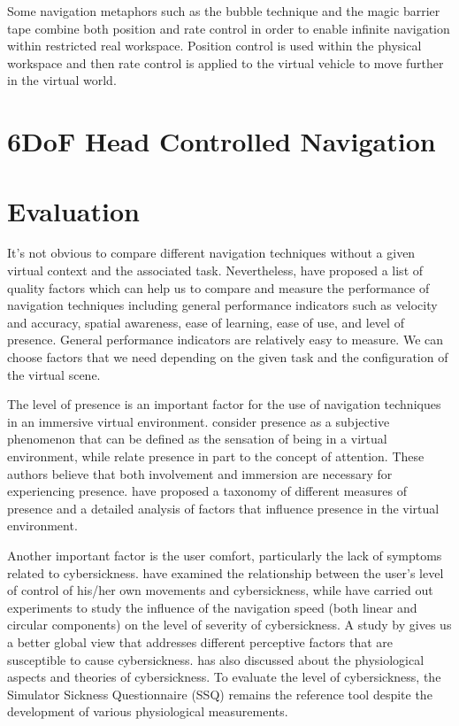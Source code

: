 Some navigation metaphors such as the bubble technique \citep{Dominjon2005Bubble} and the magic barrier tape \citep{Cirio2009MBT} combine both position and rate control in order to enable infinite navigation within restricted real workspace. Position control is used within the physical workspace and then rate control is applied to the virtual vehicle to move further in the virtual world.

\section{6DoF Head Controlled Navigation}

\section{Evaluation}

It's not obvious to compare different navigation techniques without a given virtual context and the associated task. Nevertheless, \citet{Bowman1997TIV} have proposed a list of quality factors which can help us to compare and measure the performance of navigation techniques including general performance indicators such as velocity and accuracy, spatial awareness, ease of learning, ease of use, and level of presence. General performance indicators are relatively easy to measure. We can choose factors that we need depending on the given task and the configuration of the virtual scene.

The level of presence is an important factor for the use of navigation techniques in an immersive virtual environment. \citet{Slater1994DepthPre} consider presence as a subjective phenomenon that can be defined as the sensation of being in a virtual environment, while \citet{Witmer1998MPV} relate presence in part to the concept of attention. These authors believe that both involvement and immersion are necessary for experiencing presence. \citet{Schuemie2001Pres} have proposed a taxonomy of different measures of presence and a detailed analysis of factors that influence presence in the virtual environment.

Another important factor is the user comfort, particularly the lack of symptoms related to cybersickness. \citet{Rich1996AICS} have examined the relationship between the user's level of control of his/her own movements and cybersickness, while \citet{So2001ENS} have carried out experiments to study the influence of the navigation speed (both linear and circular components) on the level of severity of cybersickness. A study by \citet{Stanney2002HPIVE} gives us a better global view that addresses different perceptive factors that are susceptible to cause cybersickness. \citet{LaViola2000DCV} has also discussed about the physiological aspects and theories of cybersickness. To evaluate the level of cybersickness, the Simulator Sickness Questionnaire (SSQ) \citep{Kennedy1993SSQ} remains the reference tool despite the development of various physiological measurements.

